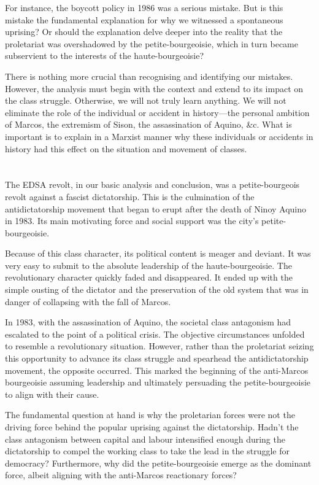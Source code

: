 For instance, the boycott policy in 1986 was a serious mistake.
But is this mistake the fundamental explanation 
for why we witnessed a spontaneous uprising?
Or should the explanation delve deeper 
into the reality that the proletariat was overshadowed 
by the petite-bourgeoisie, 
which in turn became subservient 
to the interests of the haute-bourgeoisie?

There is nothing more crucial 
than recognising and identifying our mistakes. 
However, the analysis must begin 
with the context and extend to its impact on the class struggle. 
Otherwise, we will not truly learn anything. 
We will not eliminate the role of the individual 
or accident in history---the 
personal ambition of Marcos, 
the extremism of Sison, 
the assassination of Aquino, \&c. 
What is important is to explain in a Marxist manner 
why these individuals or accidents in history 
had this effect on the situation and movement of classes.


\section{}
The EDSA revolt, 
in our basic analysis and conclusion, 
was a petite-bourgeois revolt against a fascist dictatorship. 
This is the culmination of the antidictatorship movement 
that began to erupt after the death of Ninoy Aquino in 1983. 
Its main motivating force and social support was the city's petite-bourgeoisie.

Because of this class character, 
its political content is meager and deviant. 
It was very easy to submit to the absolute leadership of the haute-bourgeoisie. 
The revolutionary character quickly faded and disappeared. 
It ended up with the simple ousting of the dictator 
and the preservation of the old system that was in danger of collapsing 
with the fall of Marcos.

In 1983, with the assassination of Aquino, 
the societal class antagonism had escalated 
to the point of a political crisis. 
The objective circumstances unfolded 
to resemble a revolutionary situation. 
However, rather than the proletariat seizing this opportunity 
to advance its class struggle 
and spearhead the antidictatorship movement, 
the opposite occurred. 
This marked the beginning of the anti-Marcos bourgeoisie 
assuming leadership and ultimately persuading 
the petite-bourgeoisie to align with their cause.

The fundamental question at hand 
is why the proletarian forces 
were not the driving force 
behind the popular uprising against the dictatorship. 
Hadn't the class antagonism between capital and labour 
intensified enough during the dictatorship 
to compel the working class 
to take the lead in the struggle for democracy? 
Furthermore, 
why did the petite-bourgeoisie emerge as the dominant force, 
albeit aligning with the anti-Marcos reactionary forces?


